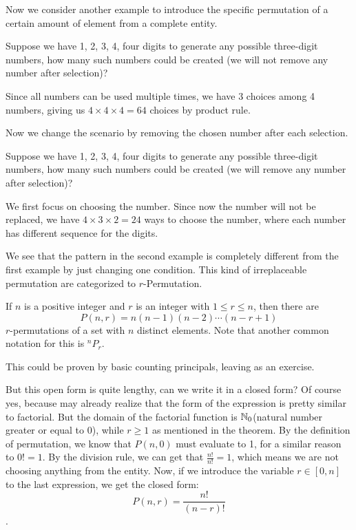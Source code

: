          Now we consider another example to introduce the specific permutation of 
         a certain amount of element from a complete entity.

         \begin{example}
            Suppose we have 1, 2, 3, 4, four digits to generate any possible three-digit 
            numbers, how many such numbers could be created (we will not remove any number
            after selection)?
            \begin{solution}
                Since all numbers can be used multiple times, we have 3 choices among 4 numbers,
                giving us \(4\times 4 \times 4 = 64\) choices by product rule.
            \end{solution}
         \end{example}
         Now we change the scenario by removing the chosen number after each selection.
         \begin{example} \label{numberselect}
            Suppose we have 1, 2, 3, 4, four digits to generate any possible three-digit 
            numbers, how many such numbers could be created (we will remove any number
            after selection)?
        \begin{solution}
            We first focus on choosing the number. Since now the number will not be replaced,
            we have \(4\times 3 \times 2 = 24\) ways to choose the number, where each number has 
            different sequence for the digits.
        \end{solution}
        \end{example}
        We see that the pattern in the second example is completely different from the first example by 
        just changing one condition. This kind of irreplaceable permutation are categorized
        to $r$-Permutation.
        \begin{theorem}[$r$-Permutation]
            If $n$ is a positive integer and $r$ is an integer with $1\leq r\leq n$, then there are
            $$
            P(n,r)=n(n-1)(n-2)\cdots(n-r+1)
            $$
            $r$-permutations of a set with $n$ distinct elements.
            Note that another common notation for this is $^n P_r$.
        \end{theorem}
        
        This could be proven by basic counting principals, leaving as an exercise.

        But this open form is quite lengthy, can we write it in a closed form? Of course yes,
        because may already realize that the form of the expression is pretty similar to 
        factorial. But the domain of the factorial function is $\mathbb{N}_0$(natural number greater
        or equal to 0), while $r\geq 1$ as mentioned in the theorem. By the definition of 
        permutation, we know that $P(n,0)$ must evaluate to 1, for a similar reason to $0!=1$. By the division 
        rule, we can get that $\frac{n!}{n!}=1$, which means we are not choosing anything from
        the entity. Now, if we introduce the variable $r\in[0,n]$ to the last expression, we get
        the closed form: $$P(n,r) = \frac{n!}{(n-r)!}$$.

